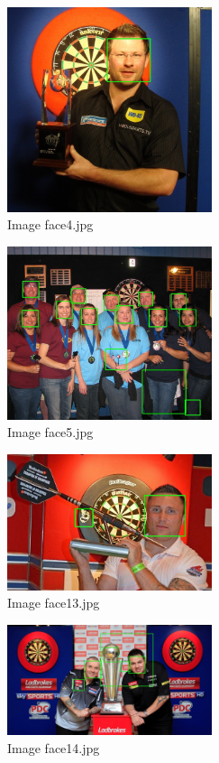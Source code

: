 \documentclass[conference]{IEEEtran}
\begin{document}
\begin{figure}[ht!]
\centering
\includegraphics[width=60mm]{img/Viola_Jones_Faces/face_detection4.jpg}
\caption{Image face4.jpg \label{img_face_4}}
\end{figure}

\begin{figure}[ht!]
\centering
\includegraphics[width=60mm]{img/Viola_Jones_Faces/face_detection5.jpg}
\caption{Image face5.jpg \label{img_face_5}}
\end{figure}

\begin{figure}[ht!]
\centering
\includegraphics[width=60mm]{img/Viola_Jones_Faces/face_detection13.jpg}
\caption{Image face13.jpg \label{img_face_13}}
\end{figure}

\begin{figure}[ht!]
\centering
\includegraphics[width=60mm]{img/Viola_Jones_Faces/face_detection14.jpg}
\caption{Image face14.jpg \label{img_face_14}}
\end{figure}
\end{document}
